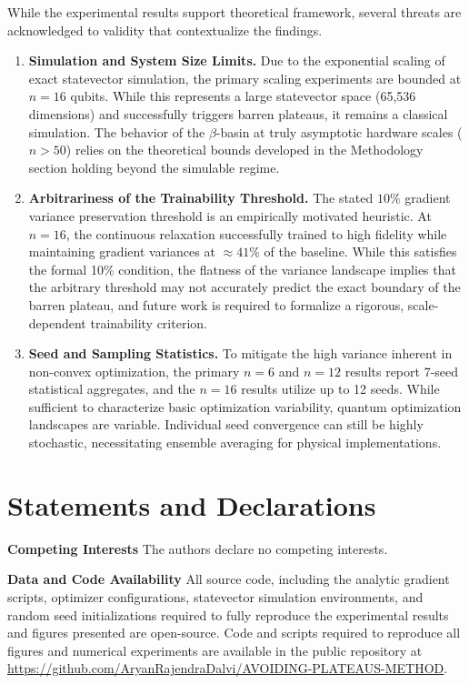 \documentclass[10pt,twocolumn]{article}
\theoremstyle{remark}
\begin{document}
While the experimental results support theoretical framework, several threats are acknowledged to validity that contextualize the findings.
\begin{enumerate}
    \item \textbf{Simulation and System Size Limits.} Due to the exponential scaling of exact statevector simulation, the primary scaling experiments are bounded at $n=16$ qubits. While this represents a large statevector space (65,536 dimensions) and successfully triggers barren plateaus, it remains a classical simulation. The behavior of the $\beta$-basin at truly asymptotic hardware scales ($n > 50$) relies on the theoretical bounds developed in the Methodology section holding beyond the simulable regime.
    \item \textbf{Arbitrariness of the Trainability Threshold.} The stated $10\%$ gradient variance preservation threshold is an empirically motivated heuristic. At $n=16$, the continuous relaxation successfully trained to high fidelity while maintaining gradient variances at $\approx 41\%$ of the baseline. While this satisfies the formal 10\% condition, the flatness of the variance landscape implies that the arbitrary threshold may not accurately predict the exact boundary of the barren plateau, and future work is required to formalize a rigorous, scale-dependent trainability criterion.
    \item \textbf{Seed and Sampling Statistics.} To mitigate the high variance inherent in non-convex optimization, the primary $n=6$ and $n=12$ results report 7-seed statistical aggregates, and the $n=16$ results utilize up to 12 seeds. While sufficient to characterize basic optimization variability, quantum optimization landscapes are variable. Individual seed convergence can still be highly stochastic, necessitating ensemble averaging for physical implementations.
\end{enumerate}

\section*{Statements and Declarations}

\textbf{Competing Interests}
The authors declare no competing interests.

\textbf{Data and Code Availability}
\label{sec:data}
All source code, including the analytic gradient scripts, optimizer configurations, statevector simulation environments, and random seed initializations required to fully reproduce the experimental results and figures presented are open-source. Code and scripts required to reproduce all figures and numerical experiments are available in the public repository at \url{https://github.com/AryanRajendraDalvi/AVOIDING-PLATEAUS-METHOD}.
\end{document}
